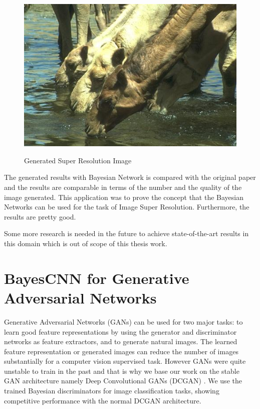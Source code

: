 \begin{figure}[H]
\begin{center}
\includegraphics{Chapter6/Figs/camel_LR.png}
\label{fig:CamelSR}
\caption{Generated Super Resolution Image}
\end{center}
\end{figure}

The generated results with Bayesian Network is compared with the original paper and the results are comparable in terms of the number and the quality of the image generated. This application was to prove the concept that the Bayesian Networks can be used for the task of Image Super Resolution. Furthermore, the results are pretty good. 

Some more research is needed in the future to achieve state-of-the-art results in this domain which is out of scope of this thesis work.




\section{BayesCNN for Generative Adversarial Networks}

Generative Adversarial Networks (GANs) \cite{goodfellow2014generative} can be used for two major tasks: to learn good feature representations by using the generator and discriminator networks as feature extractors, and to generate natural images. The learned feature representation or generated images can reduce the number of images substantially for a computer vision supervised task. However GANs were quite unstable to train in the past and that is why we base our work on the stable GAN architecture namely Deep Convolutional GANs (DCGAN) \cite{DBLP:journals/corr/RadfordMC15}. We use the trained Bayesian discriminators for image classification tasks, showing competitive performance with the normal DCGAN architecture.

